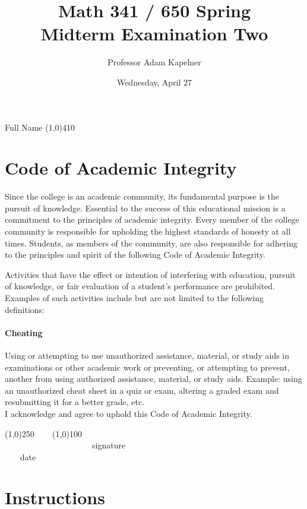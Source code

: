 \documentclass[12pt]{article}
\title{Math 341 / 650 Spring \the\year \\ Midterm Examination Two}
\author{Professor Adam Kapelner}
\date{Wednesday, April 27}
\begin{document}
\maketitle

\noindent Full Name \line(1,0){410}

\thispagestyle{empty}

\section*{Code of Academic Integrity}

\footnotesize
Since the college is an academic community, its fundamental purpose is the pursuit of knowledge. Essential to the success of this educational mission is a commitment to the principles of academic integrity. Every member of the college community is responsible for upholding the highest standards of honesty at all times. Students, as members of the community, are also responsible for adhering to the principles and spirit of the following Code of Academic Integrity.

Activities that have the effect or intention of interfering with education, pursuit of knowledge, or fair evaluation of a student's performance are prohibited. Examples of such activities include but are not limited to the following definitions:

\paragraph{Cheating} Using or attempting to use unauthorized assistance, material, or study aids in examinations or other academic work or preventing, or attempting to prevent, another from using authorized assistance, material, or study aids. Example: using an unauthorized cheat sheet in a quiz or exam, altering a graded exam and resubmitting it for a better grade, etc.
\\

\noindent I acknowledge and agree to uphold this Code of Academic Integrity. \\

\begin{center}
\line(1,0){250} ~~~ \line(1,0){100}\\
~~~~~~~~~~~~~~~~~~~~~signature~~~~~~~~~~~~~~~~~~~~~~~~~~~~~~~~~~~~~~~~~~~~~ date
\end{center}

\normalsize

\section*{Instructions}
\end{document}
